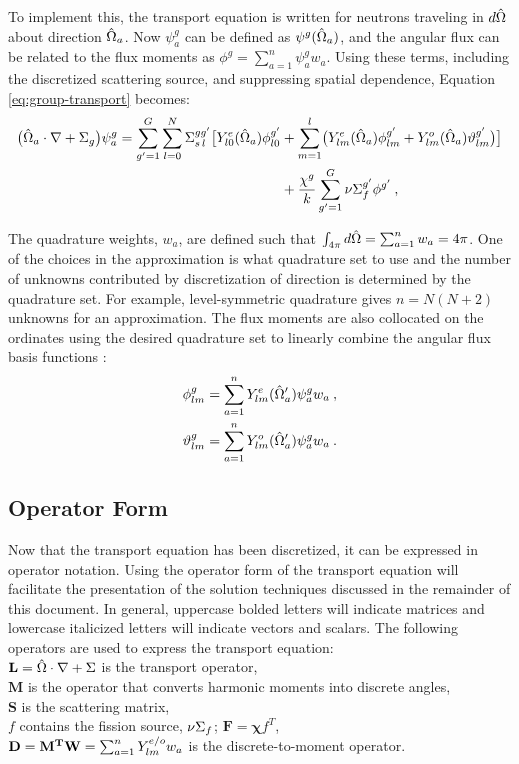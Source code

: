 To implement this, the transport equation is written for neutrons traveling in $d\hat{\Omega}$ about direction $\hat{\Omega}_{a}$. Now $\psi^{g}_{a}$ can be defined as $\psi^{g}(\hat{\Omega}_{a})$, and the angular flux can be related to the flux moments as $\phi^{g} = \sum_{a=1}^{n}\psi^{g}_{a}w_{a}$. Using these terms, including the discretized scattering source, and suppressing spatial dependence, Equation \eqref{eq:group-transport} becomes:
%
\begin{align}
 \bigl( \hat{\Omega}_{a} \cdot \nabla + \Sigma_{g} \bigr) \psi^g_{a} = \sum_{g' = 1}^{G} \sum_{l=0}^{N} \Sigma^{gg'}_{s\,l} \bigl[ Y^{e}_{l0}(\hat{\Omega}_{a}) \phi^{g'}_{l0} &+ \sum_{m=1}^{l} \bigl( Y^{e}_{lm}(\hat{\Omega}_{a}) \phi^{g'}_{lm} + Y^{o}_{lm}(\hat{\Omega}_{a}) \vartheta^{g'}_{lm} \bigr) \bigr] \nonumber \\
 &+ \frac{\chi^{g}}{k} \sum_{g'=1}^{G} \nu \Sigma_{f}^{g'}\phi^{g'} \:,
  \label{eq:mg-sn-transport}
\end{align}

The quadrature weights, $w_{a}$, are defined such that $\int_{4 \pi} d\hat{\Omega} =  \sum_{a=1}^{n}w_{a} = 4 \pi$. One of the choices in the \Sn approximation is what quadrature set to use and the number of unknowns contributed by discretization of direction is determined by the quadrature set. For example, level-symmetric quadrature gives $n = N(N+2)$ unknowns for an \Sn approximation. The flux moments are also collocated on the ordinates using the desired quadrature set to linearly combine the angular flux basis functions \cite{Evans2009}:
%
\begin{align}
  \phi^g_{lm} &= \sum_{a=1}^{n}Y^e_{lm}(\hat{\Omega}'_a)\psi^g_a w_a\:,
  \label{eq:even-flux-quad-int}\\
  \vartheta^g_{lm} &= \sum_{a=1}^{n}Y^o_{lm}(\hat{\Omega}'_a)\psi^g_a w_a\:.
  \label{eq:odd-flux-quad-int}
\end{align}

\subsection{Operator Form}
Now that the transport equation has been discretized, it can be expressed in operator notation. Using the operator form of the transport equation will facilitate the presentation of the solution techniques discussed in the remainder of this document. In general, uppercase bolded letters will indicate matrices and lowercase italicized letters will indicate vectors and scalars. The following operators are used to express the transport equation:\\
%
\indent $\mathbf{L} = \hat{\Omega} \cdot \nabla + \Sigma$ is the transport operator, \\
\indent $\mathbf{M}$ is the operator that converts harmonic moments into discrete angles, \\
\indent $\mathbf{S}$ is the scattering matrix, \\
\indent $f$ contains the fission source, $\nu \Sigma_{f}$; $\mathbf{F} =\mathbf{\chi} f^{T}$, \\ 
\indent $\mathbf{D} = \mathbf{M^{T}}\mathbf{W} = \sum_{a=1}^{n}Y^{e/o}_{lm}w_{a}$ is the discrete-to-moment operator. 

